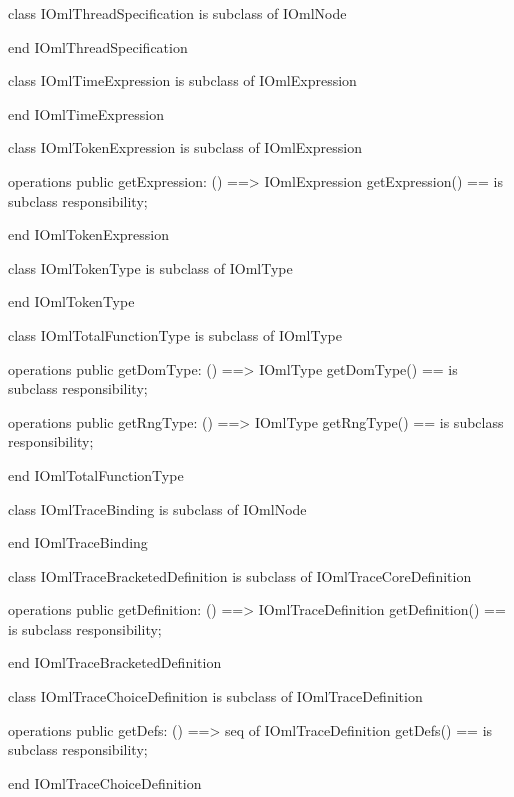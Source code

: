 \begin{vdm_al}
class IOmlThreadSpecification
 is subclass of IOmlNode

end IOmlThreadSpecification
\end{vdm_al}

\begin{vdm_al}
class IOmlTimeExpression
 is subclass of IOmlExpression

end IOmlTimeExpression
\end{vdm_al}

\begin{vdm_al}
class IOmlTokenExpression
 is subclass of IOmlExpression

operations
  public getExpression: () ==> IOmlExpression
  getExpression() == is subclass responsibility;

end IOmlTokenExpression
\end{vdm_al}

\begin{vdm_al}
class IOmlTokenType
 is subclass of IOmlType

end IOmlTokenType
\end{vdm_al}

\begin{vdm_al}
class IOmlTotalFunctionType
 is subclass of IOmlType

operations
  public getDomType: () ==> IOmlType
  getDomType() == is subclass responsibility;

operations
  public getRngType: () ==> IOmlType
  getRngType() == is subclass responsibility;

end IOmlTotalFunctionType
\end{vdm_al}

\begin{vdm_al}
class IOmlTraceBinding
 is subclass of IOmlNode

end IOmlTraceBinding
\end{vdm_al}

\begin{vdm_al}
class IOmlTraceBracketedDefinition
 is subclass of IOmlTraceCoreDefinition

operations
  public getDefinition: () ==> IOmlTraceDefinition
  getDefinition() == is subclass responsibility;

end IOmlTraceBracketedDefinition
\end{vdm_al}

\begin{vdm_al}
class IOmlTraceChoiceDefinition
 is subclass of IOmlTraceDefinition

operations
  public getDefs: () ==> seq of IOmlTraceDefinition
  getDefs() == is subclass responsibility;

end IOmlTraceChoiceDefinition
\end{vdm_al}

